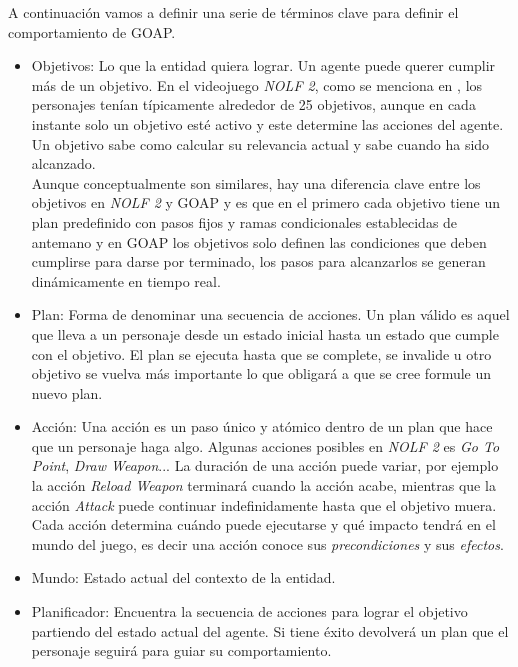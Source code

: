 A continuación vamos a definir una serie de términos clave para definir el comportamiento de GOAP.
\begin{itemize}
	 \item Objetivos: Lo que la entidad quiera lograr. Un agente puede querer cumplir más de un objetivo. En el videojuego \textit{NOLF 2}, como se menciona en \citet{GOAP_Jeff_Orkin}, los personajes tenían típicamente alrededor de 25 objetivos, aunque en cada instante solo un objetivo esté activo y este determine las acciones del agente. Un objetivo sabe como calcular su relevancia actual y sabe cuando ha sido alcanzado.\\
Aunque conceptualmente son similares, hay una diferencia clave entre los objetivos en \textit{NOLF 2} y GOAP y es que en el primero cada objetivo tiene un plan predefinido con pasos fijos y ramas condicionales establecidas de antemano y en GOAP los objetivos solo definen las condiciones que deben cumplirse para darse por terminado, los pasos para alcanzarlos se generan dinámicamente en tiempo real.

	 \item Plan: Forma de denominar una secuencia de acciones. Un plan válido es aquel que lleva a un personaje desde un estado inicial hasta un estado que cumple con el objetivo. El plan se ejecuta hasta que se complete, se invalide u otro objetivo se vuelva más importante lo que obligará a que se cree formule un nuevo plan.

	 \item Acción: Una acción es un paso único y atómico dentro de un plan que hace que un personaje haga algo. Algunas acciones posibles en \textit{NOLF 2} es \textit{Go To Point}, \textit{Draw Weapon}...
La duración de una acción puede variar, por ejemplo la acción \textit{Reload Weapon} terminará cuando la acción acabe, mientras que la acción \textit{Attack} puede continuar indefinidamente hasta que el objetivo muera.\\
Cada acción determina cuándo puede ejecutarse y qué impacto tendrá en el mundo del juego, es decir una acción conoce sus \textit{precondiciones} y sus \textit{efectos}.
	
	\item Mundo: Estado actual del contexto de la entidad.
 	
	\item Planificador: Encuentra la secuencia de acciones para lograr el objetivo partiendo del estado actual del agente. Si tiene éxito devolverá un plan que el personaje seguirá para guiar su comportamiento.\\


\end{itemize}
